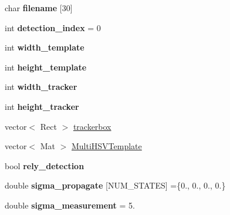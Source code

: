 \begin{DoxyCompactItemize}
\item 
\hypertarget{classParticleFilter_a00812e7cc3f90eced41028b01e6a4eb3}{char {\bfseries filename} \mbox{[}30\mbox{]}}\label{classParticleFilter_a00812e7cc3f90eced41028b01e6a4eb3}

\item 
\hypertarget{classParticleFilter_aa60e8238079bf881e38d89a1cd1c67ec}{int {\bfseries detection\-\_\-index} = 0}\label{classParticleFilter_aa60e8238079bf881e38d89a1cd1c67ec}

\item 
\hypertarget{classParticleFilter_a85d85c884552bc65db7e31f4c3fbd719}{int {\bfseries width\-\_\-template}}\label{classParticleFilter_a85d85c884552bc65db7e31f4c3fbd719}

\item 
\hypertarget{classParticleFilter_af15c089ca4541ccb4a98fba68fc36da0}{int {\bfseries height\-\_\-template}}\label{classParticleFilter_af15c089ca4541ccb4a98fba68fc36da0}

\item 
\hypertarget{classParticleFilter_a22c5a9164e71520d574192d0d79fd175}{int {\bfseries width\-\_\-tracker}}\label{classParticleFilter_a22c5a9164e71520d574192d0d79fd175}

\item 
\hypertarget{classParticleFilter_ab8a94b66de1cf76b6fe7c2a58a1947d3}{int {\bfseries height\-\_\-tracker}}\label{classParticleFilter_ab8a94b66de1cf76b6fe7c2a58a1947d3}

\item 
vector$<$ Rect $>$ \hyperlink{classParticleFilter_ad7931abf64ab6494bae0d9884536e97d}{trackerbox}
\item 
vector$<$ Mat $>$ \hyperlink{classParticleFilter_a83d30593ad7fb15decdc3ed135dcde0c}{Multi\-H\-S\-V\-Template}
\item 
\hypertarget{classParticleFilter_af325f836517447303d8f06b50af71b9f}{bool {\bfseries rely\-\_\-detection}}\label{classParticleFilter_af325f836517447303d8f06b50af71b9f}

\item 
\hypertarget{classParticleFilter_a736488bb4a98a52b439926c09b36f254}{double {\bfseries sigma\-\_\-propagate} \mbox{[}N\-U\-M\-\_\-\-S\-T\-A\-T\-E\-S\mbox{]} =\{0., 0., 0., 0.\}}\label{classParticleFilter_a736488bb4a98a52b439926c09b36f254}

\item 
\hypertarget{classParticleFilter_a1ecbbf2428339e5f606570c7b6fa69e8}{double {\bfseries sigma\-\_\-measurement} = 5.}\label{classParticleFilter_a1ecbbf2428339e5f606570c7b6fa69e8}


\end{DoxyCompactItemize}
